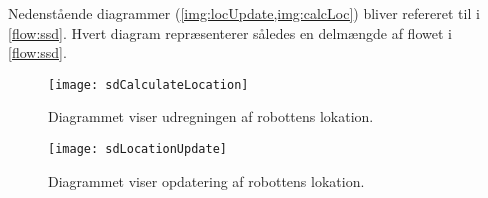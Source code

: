 Nedenstående diagrammer (\cref{img:locUpdate,img:calcLoc}) bliver refereret til i \cref{flow:ssd}.
Hvert diagram repræsenterer således en delmængde af flowet i \cref{flow:ssd}.

\begin{figure}[H]
\centering \texttt{[image: sdCalculateLocation]}
\caption{Diagrammet viser udregningen af robottens lokation.}
\label{img:calcLoc}
\end{figure}

\begin{figure}[H]
\centering \texttt{[image: sdLocationUpdate]}
\caption{Diagrammet viser opdatering af robottens lokation.}
\label{img:locUpdate}
\end{figure} 


	